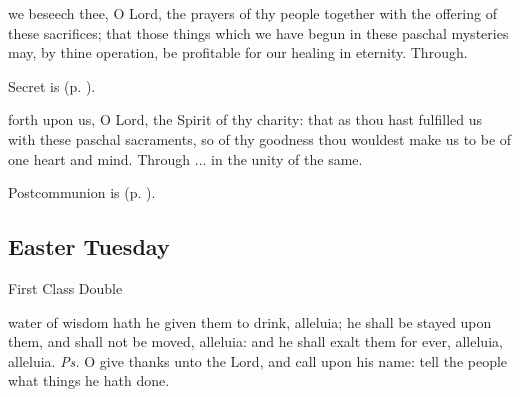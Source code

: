 
\vspace{-0.5\baselineskip}

\secret

\vspace{-0.1\baselineskip}

 we beseech thee, O Lord, the prayers of thy people together with the offering of these sacrifices; that those things which we have begun in these paschal mysteries may, by thine operation, be profitable for our healing in eternity. Through.
\begin{rubric}
     Secret is  (p. \pageref{EasterSecret}).
\end{rubric}


\vspace{-0.5\baselineskip}

\postcommunion

\vspace{-0.1\baselineskip}

 forth upon us, O Lord, the Spirit of thy charity: that as thou hast fulfilled us with these paschal sacraments, so of thy goodness thou wouldest make us to be of one heart and mind. Through ... in the unity of the same.

\begin{rubric}
     Postcommunion is  (p. \pageref{EasterPostcommunion}).
\end{rubric}

\subsection{Easter Tuesday}
\begin{inhead}
    {First Class Double}
\end{inhead}

\introit
{} water of wisdom hath he given them to drink, alleluia; he shall be stayed upon them, and shall not be moved, alleluia: and he shall exalt them for ever, alleluia, alleluia. \textit{Ps.} O give thanks unto the Lord, and call upon his name: tell the people what things he hath done.

